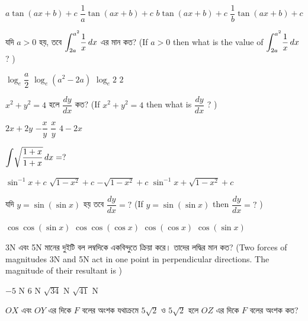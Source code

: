 \documentclass[addpoints]{exam}
\begin{document}
\begin{questions}
\begin{oneparchoices}
\choice $ a\tan (ax+b) + c $
\choice $ \dfrac{1}{a}\tan (ax+b) + c $
\choice $ b\tan (ax+b) + c $
\choice $ \dfrac{1}{b}\tan (ax+b) + c $
\end{oneparchoices}

\question যদি $ a>0 $ হয়, তবে $ \mathlarger{\int_{2a}^{a^{2}}}\dfrac{1}{x}\, dx$ এর মান কত? (If $ a>0 $ then what is the value of $ \mathlarger{\int_{2a}^{a^{2}}}\dfrac{1}{x}\, dx$ ? )

\begin{oneparchoices}
\choice $ \log_{e}\dfrac{a}{2} $
\choice $ \log_{e}(a^{2}-2a) $
\choice $ \log_{e}2 $
\choice $ 2 $
\end{oneparchoices}

\question $ x^{2}+y^{2}=4 $ হলে $ \dfrac{dy}{dx} $ কত? (If $ x^{2}+y^{2}=4 $ then what is $ \dfrac{dy}{dx} $ ? )

\begin{oneparchoices}
\choice  $ 2x+2y $
\choice  $ -\dfrac{x}{y} $
\choice  $\dfrac{x}{y} $
\choice  $ 4-2x $
\end{oneparchoices}


\question  $ \mathlarger{\int}\sqrt{\dfrac{1+x}{1+x}}\,dx = ? $

\begin{oneparchoices}
\choice $ \sin^{-1}x+c $
\choice $ \sqrt{1-x^{2}}+c $
\choice $ -\sqrt{1-x^{2}}+c $
\choice $ \sin^{-1}x+\sqrt{1-x^{2}}+c $
\end{oneparchoices}

\question  যদি $ y = \sin(\sin x) $ হয় তবে $ \dfrac{dy}{dx}=? $ (If $ y = \sin(\sin x) $ then $ \dfrac{dy}{dx}=? $ )

\begin{oneparchoices}
\choice $ \cos\cos(\sin x) $
\choice $ \cos\cos(\cos x) $
\choice $ \cos(\cos x) $
\choice $ \cos (\sin x) $
\end{oneparchoices}

\question 3N এবং 5N মানের দুইটি বল লম্বদিকে একবিন্দুতে ক্রিয়া করে। তাদের লদ্ধির মান কত? (Two forces of magnitudes 3N and 5N act in one point in perpendicular directions. The magnitude of their resultant is ) 

\begin{oneparchoices}
\choice $ -5 $ N
\choice $ 6 $ N
\choice $ \sqrt{34} $ N
\choice $ \sqrt{41} $ N  
\end{oneparchoices}


\question $ OX $ এবং $ OY $ এর দিকে $ F $ বলের অংশক যথাক্রমে $ 5\sqrt{2} $ ও $ 5\sqrt{2} $ হলে $ OZ $ এর দিকে $ F $ বলের অংশক কত?


\end{questions}
\end{document}
